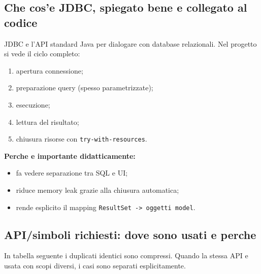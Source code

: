 \documentclass[12pt,a4paper]{article}
\begin{document}
\subsection{Che cos'e JDBC, spiegato bene e collegato al codice}
JDBC e l'API standard Java per dialogare con database relazionali.
Nel progetto si vede il ciclo completo:
\begin{enumerate}
  \item apertura connessione;
  \item preparazione query (spesso parametrizzate);
  \item esecuzione;
  \item lettura del risultato;
  \item chiusura risorse con \texttt{try-with-resources}.
\end{enumerate}

\textbf{Perche e importante didatticamente:}
\begin{itemize}
  \item fa vedere separazione tra SQL e UI;
  \item riduce memory leak grazie alla chiusura automatica;
  \item rende esplicito il mapping \texttt{ResultSet -> oggetti model}.
\end{itemize}

\subsection{API/simboli richiesti: dove sono usati e perche}
In tabella seguente i duplicati identici sono compressi.
Quando la stessa API e usata con scopi diversi, i casi sono separati esplicitamente.
\end{document}
